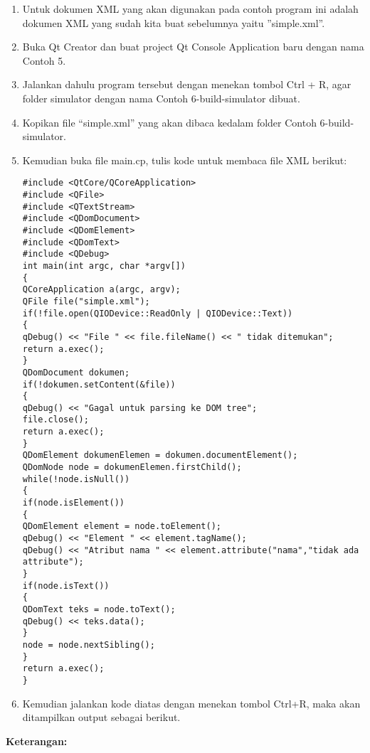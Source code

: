 \begin{enumerate}
\def\labelenumi{\arabic{enumi}.}
\item
  Untuk dokumen XML yang akan digunakan pada contoh program ini adalah
  dokumen XML yang sudah kita buat sebelumnya yaitu ''simple.xml''.
\item
  Buka Qt Creator dan buat project Qt Console Application baru dengan
  nama Contoh 5.
\item
  Jalankan dahulu program tersebut dengan menekan tombol Ctrl + R, agar
  folder simulator dengan nama Contoh 6-build-simulator dibuat.
\item
  Kopikan file ``simple.xml'' yang akan dibaca kedalam folder Contoh
  6-build-simulator.
\item
  Kemudian buka file main.cp, tulis kode untuk membaca file XML berikut:

\begin{verbatim}
#include <QtCore/QCoreApplication>
#include <QFile>
#include <QTextStream>
#include <QDomDocument>
#include <QDomElement>
#include <QDomText>
#include <QDebug>
int main(int argc, char *argv[])
{
QCoreApplication a(argc, argv);
QFile file("simple.xml");
if(!file.open(QIODevice::ReadOnly | QIODevice::Text))
{
qDebug() << "File " << file.fileName() << " tidak ditemukan";
return a.exec();
}
QDomDocument dokumen;
if(!dokumen.setContent(&file))
{
qDebug() << "Gagal untuk parsing ke DOM tree";
file.close();
return a.exec();
}
QDomElement dokumenElemen = dokumen.documentElement();
QDomNode node = dokumenElemen.firstChild();
while(!node.isNull())
{
if(node.isElement())
{
QDomElement element = node.toElement();
qDebug() << "Element " << element.tagName();
qDebug() << "Atribut nama " << element.attribute("nama","tidak ada
attribute");
}
if(node.isText())
{
QDomText teks = node.toText();
qDebug() << teks.data();
}
node = node.nextSibling();
}
return a.exec();
}
\end{verbatim}
\item
  Kemudian jalankan kode diatas dengan menekan tombol Ctrl+R, maka akan
  ditampilkan output sebagai berikut.
\end{enumerate}

\textbf{Keterangan:}

